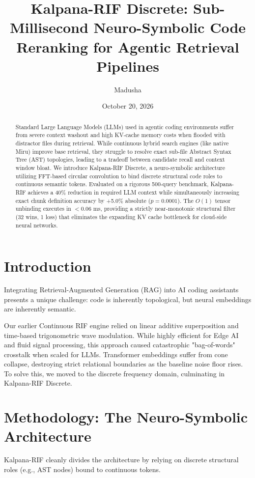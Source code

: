 \documentclass[11pt, a4paper]{article}
\title{\textbf{Kalpana-RIF Discrete: Sub-Millisecond Neuro-Symbolic Code Reranking for Agentic Retrieval Pipelines}}
\author{Madusha}
\date{October 20, 2026}
\begin{document}
\maketitle

\begin{abstract}
Standard Large Language Models (LLMs) used in agentic coding environments suffer from severe context washout and high KV-cache memory costs when flooded with distractor files during retrieval. While continuous hybrid search engines (like native Miru) improve base retrieval, they struggle to resolve exact sub-file Abstract Syntax Tree (AST) topologies, leading to a tradeoff between candidate recall and context window bloat. We introduce Kalpana-RIF Discrete, a neuro-symbolic architecture utilizing FFT-based circular convolution to bind discrete structural code roles to continuous semantic tokens. Evaluated on a rigorous 500-query benchmark, Kalpana-RIF achieves a 40\% reduction in required LLM context while simultaneously increasing exact chunk definition accuracy by +5.0\% absolute ($p = 0.0001$). The $O(1)$ tensor unbinding executes in $< 0.06$ ms, providing a strictly near-monotonic structural filter (32 wins, 1 loss) that eliminates the expanding KV cache bottleneck for cloud-side neural networks.
\end{abstract}

\section{Introduction}
Integrating Retrieval-Augmented Generation (RAG) into AI coding assistants presents a unique challenge: code is inherently topological, but neural embeddings are inherently semantic. 

Our earlier Continuous RIF engine relied on linear additive superposition and time-based trigonometric wave modulation. While highly efficient for Edge AI and fluid signal processing, this approach caused catastrophic "bag-of-words" crosstalk when scaled for LLMs. Transformer embeddings suffer from cone collapse, destroying strict relational boundaries as the baseline noise floor rises. To solve this, we moved to the discrete frequency domain, culminating in Kalpana-RIF Discrete.

\section{Methodology: The Neuro-Symbolic Architecture}
Kalpana-RIF cleanly divides the architecture by relying on discrete structural roles (e.g., AST nodes) bound to continuous tokens.
\end{document}
